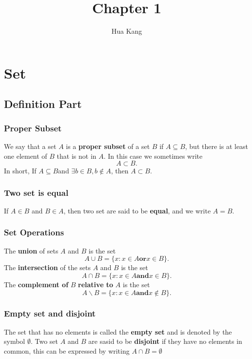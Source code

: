 \documentclass{article}
\title{Chapter 1}
\author{Hua Kang}
\begin{document}
    \maketitle
    \section{Set}
        \subsection{Definition Part}
            \subsubsection{Proper Subset}
                We say that a set $A$ is a \textbf{proper subset} of a set $B$ if $A \subseteq B$, but there is at least one element of $B$ that is not in $A$. In this case we sometimes write
                $$A \subset B.$$
                In short, If $A\subseteq B$and $\exists b \in B , b \notin A$, then $A\subset B$.
            
            \subsubsection{Two set is equal}
                If $A\in B$ and $B\in A$, then two set are said to be \textbf{equal}, and we write $A=B$.
            
            \subsubsection{Set Operations}
                The \textbf{union} of sets $A$ and $B$ is the set
                $$A \cup B =\{x:x\in A \textbf{or} x\in B\} .$$
                The \textbf{intersection} of the sets $A$ and $B$ is the set
                $$ A\cap B =\{x:x\in A \textbf{and}x\in B\}.$$
                The \textbf{complement of} $B$ \textbf{relative to} $A$ is the set
                $$A\backslash B=\{x:x\in A \textbf{and} x \notin B\}.$$

            \subsubsection{Empty set and disjoint}
                The set that has no elements is called the \textbf{empty set} and is denoted by the symbol  $\emptyset$. Two set $A$ and $B$ are sasid to be \textbf{disjoint} if they have no elements in common, this can be expressed by writing $A \cap B =\emptyset$
            
\end{document}
